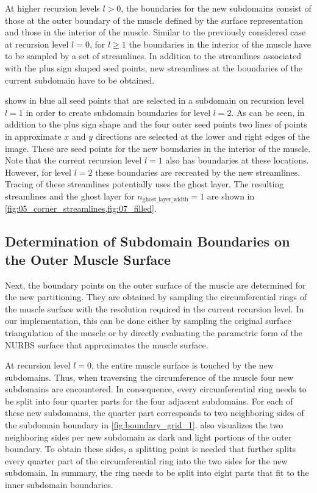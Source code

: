 At higher recursion levels $l>0$, the boundaries for the new subdomains consist of those at the outer boundary of the muscle defined by the surface representation and those in the interior of the muscle.
Similar to the previously considered case at recursion level $l=0$, for $l\geq 1$ the boundaries in the interior of the muscle have to be sampled by a set of streamlines. In addition to the streamlines associated with the plus sign shaped seed points, new streamlines at the boundaries of the current subdomain have to be obtained.

 shows in blue all seed points that are selected in a subdomain on recursion level $l=1$ in order to create subdomain boundaries for level $l=2$.
As can be seen, in addition to the plus sign shape and the four outer seed points two lines of points in approximate $x$ and $y$ directions are selected at the lower and right edges of the image.
These are seed points for the new boundaries in the interior of the muscle. Note that the current recursion level $l=1$ also has boundaries at these locations. However, for level $l=2$ these boundaries are recreated by the new streamlines. Tracing of these streamlines potentially uses the ghost layer. The resulting streamlines and the ghost layer for $n_\text{ghost\_layer\_width}=1$ are shown in \cref{fig:05_corner_streamlines,fig:07_filled}.

\subsection{Determination of Subdomain Boundaries on the Outer Muscle Surface}

Next, the boundary points on the outer surface of the muscle are determined for the new partitioning. They are obtained by sampling the circumferential rings of the muscle surface with the resolution required in the current recursion level. In our implementation, this can be done either by sampling the original surface triangulation of the muscle or by directly evaluating the parametric form of the NURBS surface that approximates the muscle surface.

At recursion level $l=0$, the entire muscle surface is touched by the new subdomains. Thus, when traversing the circumference of the muscle four new subdomains are encountered.
In consequence, every circumferential ring needs to be split into four quarter parts for the four adjacent subdomains. For each of these new subdomains, the quarter part corresponds to two neighboring sides of the subdomain boundary in \cref{fig:boundary_grid_1}.  also visualizes the two neighboring sides per new subdomain as dark and light portions of the outer boundary. 
To obtain these sides, a splitting point is needed that further splits every quarter part of the circumferential ring into the two sides for the new subdomain.
In summary, the ring needs to be split into eight parts that fit to the inner subdomain boundaries.

